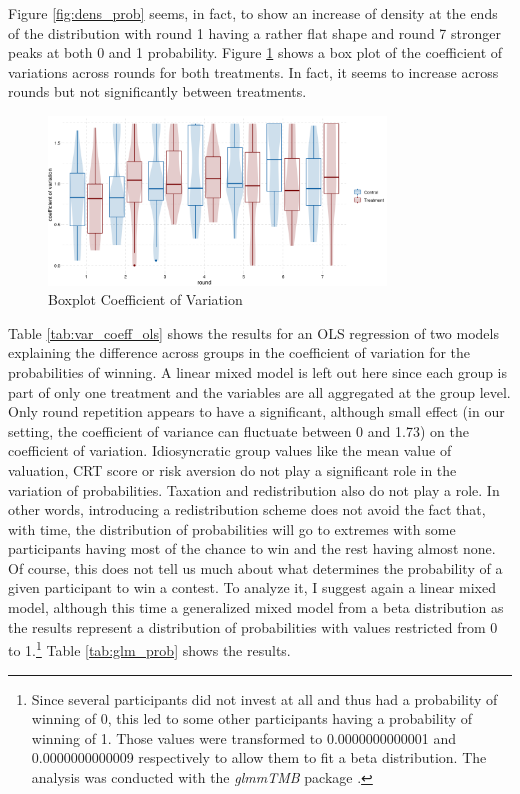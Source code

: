 Figure \ref{fig:dens_prob} seems, in fact, to show an increase of density at the ends of the distribution with round 1 having a rather flat shape and round 7 stronger peaks at both 0 and 1 probability. Figure \ref{fig:var_coeff_boxplot} shows a box plot of the coefficient of variations across rounds for both treatments. In fact, it seems to increase across rounds but not significantly between treatments.\\

\begin{figure}[H]
    \centering
    \includegraphics[width = 0.8\textwidth]{graphs/var_coeff_prob_boxplot.png}
    \caption{Boxplot Coefficient of Variation}
    \label{fig:var_coeff_boxplot}
\end{figure}

Table \ref{tab:var_coeff_ols} shows the results for an OLS regression of two models explaining the difference across groups in the coefficient of variation for the probabilities of winning. A linear mixed model is left out here since each group is part of only one treatment and the variables are all aggregated at the group level. Only round repetition appears to have a significant, although small effect (in our setting, the coefficient of variance can fluctuate between 0 and 1.73) on the coefficient of variation. Idiosyncratic group values like the mean value of valuation, CRT score or risk aversion do not play a significant role in the variation of probabilities. Taxation and redistribution also do not play a role. In other words, introducing a redistribution scheme does not avoid the fact that, with time, the distribution of probabilities will go to extremes with some participants having most of the chance to win and the rest having almost none.\\

Of course, this does not tell us much about what determines the probability of a given participant to win a contest. To analyze it, I suggest again a linear mixed model, although this time a generalized mixed model from a beta distribution as the results represent a distribution of probabilities with values restricted from 0 to 1.\footnote{Since several participants did not invest at all and thus had a probability of winning of 0, this led to some other participants having a probability of winning of 1. Those values were transformed to 0.0000000000001 and 0.0000000000009 respectively to allow them to fit a beta distribution. The analysis was conducted with the \textit{glmmTMB} package \citep{brooks2017}.} Table \ref{tab:glm_prob} shows the results.\\

